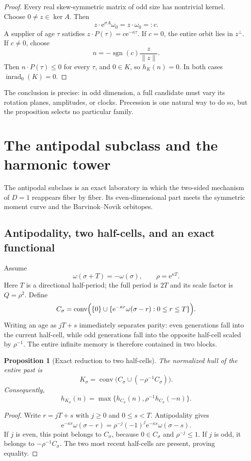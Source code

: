 \documentclass[10pt,a4paper]{article}
\newcommand{\conv}{\operatorname{conv}}
\newcommand{\inrad}{\operatorname{inrad}_{0}}
\newcommand{\sgn}{\operatorname{sgn}}
\newcommand{\e}{\mathrm{e}}
\theoremstyle{plain}
\newtheorem{proposition}[theorem]{Proposition}
\theoremstyle{definition}
\theoremstyle{remark}
\begin{document}
\begin{proof}
Every real skew-symmetric matrix of odd size has nontrivial kernel. Choose $0\neq z\in\ker A$. Then
\[
  z\cdot\e^{\sigma A}\omega_0=z\cdot\omega_0=:c.
\]
A supplier of age $\tau$ satisfies $z\cdot P(\tau)=c\e^{-\kappa\tau}$. If $c=0$, the entire orbit lies in $z^\perp$. If $c\neq0$, choose
\[
  n=-\sgn(c)\frac{z}{\|z\|}.
\]
Then $n\cdot P(\tau)\le0$ for every $\tau$, and $0\in K$, so $h_K(n)=0$. In both cases $\inrad(K)=0$.
\end{proof}

The conclusion is precise: in odd dimension, a full candidate must vary its rotation planes, amplitudes, or clocks. Precession is one natural way to do so, but the proposition selects no particular family.

\section{The antipodal subclass and the harmonic tower}

The antipodal subclass is an exact laboratory in which the two-sided mechanism of $D=1$ reappears fiber by fiber. Its even-dimensional part meets the symmetric moment curve and the Barvinok--Novik orbitopes.

\subsection{Antipodality, two half-cells, and an exact functional}

Assume
\[
  \omega(\sigma+T)=-\omega(\sigma),
  \qquad
  \rho=\e^{\kappa T}.
\]
Here $T$ is a directional half-period; the full period is $2T$ and its scale factor is $Q=\rho^2$. Define
\[
  C_\sigma
  =\conv\Bigl(\{0\}\cup
  \{\e^{-\kappa r}\omega(\sigma-r):0\le r\le T\}\Bigr).
\]
Writing an age as $jT+s$ immediately separates parity: even generations fall into the current half-cell, while odd generations fall into the opposite half-cell scaled by $\rho^{-1}$. The entire infinite memory is therefore contained in two blocks.

\begin{proposition}[Exact reduction to two half-cells]
The normalized hull of the entire past is
\[
  K_\sigma=\conv\bigl(C_\sigma\cup(-\rho^{-1}C_\sigma)\bigr).
\]
Consequently,
\[
  h_{K_\sigma}(n)
  =\max\{h_{C_\sigma}(n),\rho^{-1}h_{C_\sigma}(-n)\}.
\]
\end{proposition}

\begin{proof}
Write $r=jT+s$ with $j\ge0$ and $0\le s<T$. Antipodality gives
\[
  \e^{-\kappa r}\omega(\sigma-r)
  =\rho^{-j}(-1)^j\e^{-\kappa s}\omega(\sigma-s).
\]
If $j$ is even, this point belongs to $C_\sigma$, because $0\in C_\sigma$ and $\rho^{-j}\le1$. If $j$ is odd, it belongs to $-\rho^{-1}C_\sigma$. The two most recent half-cells are present, proving equality.
\end{proof}
\end{document}
